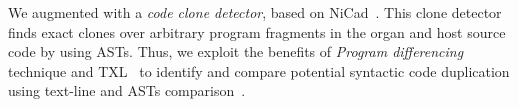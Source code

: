 We augmented \prodscalpel with a \emph{code clone detector}, based on NiCad~\cite{Roy2009}. This clone detector finds exact clones over arbitrary program fragments in the organ and host source code by using ASTs. Thus, we exploit the benefits of \emph{Program differencing}~\cite{Kernighan1983} technique and TXL~\cite{Cordy2006} to identify and compare potential syntactic code duplication using text-line and ASTs comparison~\cite{Roy2009}.
